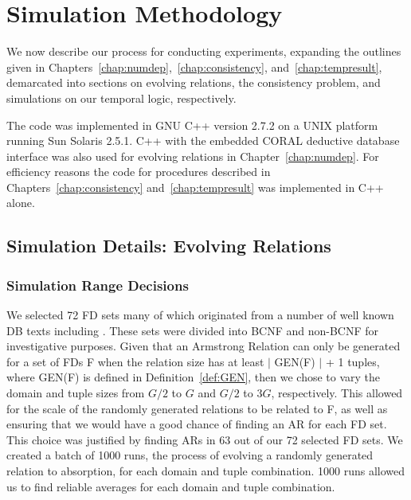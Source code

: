 \chapter{Simulation Methodology}\label{app:sim_meth}

We now describe our process for conducting experiments, expanding the
outlines given in Chapters~\ref{chap:numdep},~\ref{chap:consistency},
and~\ref{chap:tempresult}, demarcated into sections on evolving
relations, the consistency problem, and simulations on our temporal
logic, respectively.


\medskip
The code was implemented in GNU C++ version 2.7.2 on a UNIX platform running
Sun Solaris 2.5.1.  C++ with
the embedded CORAL deductive
database interface \cite{rss92} was also used for evolving relations
in Chapter~\ref{chap:numdep}. For efficiency reasons the code for procedures
described in Chapters~\ref{chap:consistency} and~\ref{chap:tempresult}
was implemented in C++ alone.
 
\section{Simulation Details: Evolving
Relations}\label{sec:sim_er}

\subsection{Simulation Range Decisions}


We selected 72 FD sets many of which originated from a number of well
known DB texts including \cite{Mann92,databasefound,atze93}. These sets were 
divided into BCNF and non-BCNF for investigative purposes. Given
that an Armstrong Relation can only be generated for a set of FDs F when
the relation size has at least \linebreak $\mid$ GEN(F) $\mid$ + 1
tuples, where 
GEN(F) is defined in Definition~\ref{def:GEN}, then we chose to vary
the domain and tuple sizes from $G/2$ to $G$ and  $G/2$ to $3G$,
respectively. This allowed for the scale of the randomly generated
relations to be related to F, as well as ensuring that we would have a
good chance of finding an AR for each FD set. This choice was
justified by finding ARs in 63 out of our 72 selected FD sets.  We
created a batch of 1000 runs, the process of evolving a randomly
generated relation to absorption, for each domain and tuple
combination. 1000 runs allowed us to find reliable averages for each
domain and tuple combination. 

